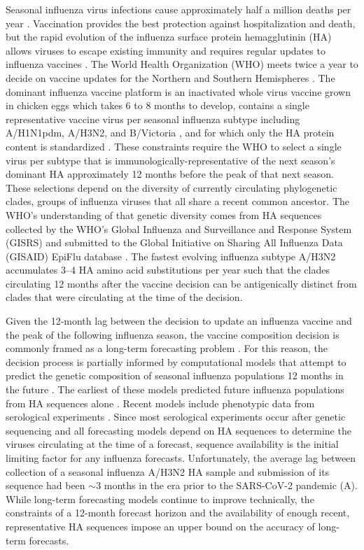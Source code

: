 \documentclass[9pt,lineno]{elife}
\begin{document}
Seasonal influenza virus infections cause approximately half a million deaths per year \citep{flufactsheet}.
Vaccination provides the best protection against hospitalization and death, but the rapid evolution of the influenza surface protein hemagglutinin (HA) allows viruses to escape existing immunity and requires regular updates to influenza vaccines \citep{Petrova2018}.
The World Health Organization (WHO) meets twice a year to decide on vaccine updates for the Northern and Southern Hemispheres \citep{Morris2018}.
The dominant influenza vaccine platform is an inactivated whole virus vaccine grown in chicken eggs \citep{Wong2013} which takes 6 to 8 months to develop, contains a single representative vaccine virus per seasonal influenza subtype including A/H1N1pdm, A/H3N2, and B/Victoria \citep{Morris2018}, and for which only the HA protein content is standardized \citep{Yamayoshi2019}.
These constraints require the WHO to select a single virus per subtype that is immunologically-representative of the next season's dominant HA approximately 12 months before the peak of that next season.
These selections depend on the diversity of currently circulating phylogenetic clades, groups of influenza viruses that all share a recent common ancestor.
The WHO's understanding of that genetic diversity comes from HA sequences collected by the WHO's Global Influenza and Surveillance and Response System (GISRS) \citep{Hay2018} and submitted to the Global Initiative on Sharing All Influenza Data (GISAID) EpiFlu database \citep{gisaid}.
The fastest evolving influenza subtype A/H3N2 accumulates 3--4 HA amino acid substitutions per year \citep{Smith2004,Kistler2023} such that the clades circulating 12 months after the vaccine decision can be antigenically distinct from clades that were circulating at the time of the decision.

Given the 12-month lag between the decision to update an influenza vaccine and the peak of the following influenza season, the vaccine composition decision is commonly framed as a long-term forecasting problem \citep{Lassig2017}.
For this reason, the decision process is partially informed by computational models that attempt to predict the genetic composition of seasonal influenza populations 12 months in the future \citep{Morris2018}.
The earliest of these models predicted future influenza populations from HA sequences alone \citep{Luksza:2014hj,Neher:2014eu,Steinbruck2014}.
Recent models include phenotypic data from serological experiments \citep{Morris2018,Huddleston2020,Meijers2023,Meijers2025}.
Since most serological experiments occur after genetic sequencing \citep{Hampson2017} and all forecasting models depend on HA sequences to determine the viruses circulating at the time of a forecast, sequence availability is the initial limiting factor for any influenza forecasts.
Unfortunately, the average lag between collection of a seasonal influenza A/H3N2 HA sample and submission of its sequence had been $\sim$3 months in the era prior to the SARS-CoV-2 pandemic (A).
While long-term forecasting models continue to improve technically, the constraints of a 12-month forecast horizon and the availability of enough recent, representative HA sequences impose an upper bound on the accuracy of long-term forecasts.
\end{document}
